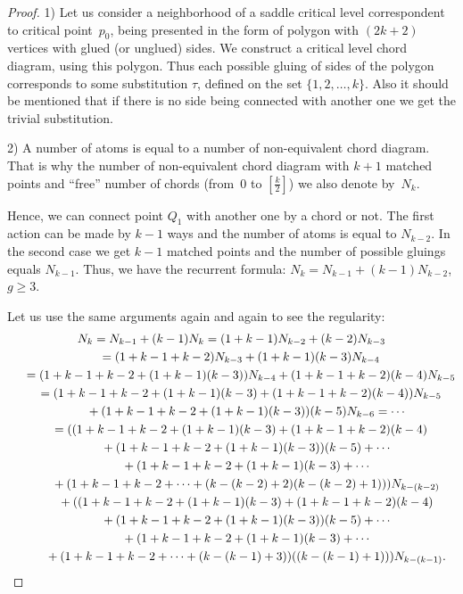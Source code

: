 \documentclass[pdftex]{sigma}
\numberwithin{equation}{section}
\begin{document}
\begin{proof}
1) Let us consider a neighborhood of a saddle critical level correspondent to critical point~$p_{0}$, being presented in the form of polygon with $(2k+2)$ vertices with glued (or unglued) sides. We construct a critical level chord diagram, using this polygon. Thus each possible gluing of sides of the polygon corresponds to some substitution $\tau$, def\/ined on the set $\{1,2,\dots,k\}$. Also it should be mentioned that if there is no side being connected with another one we get the trivial substitution.

2) A number of atoms is equal to a number of non-equivalent chord diagram. That is why the number of non-equivalent chord diagram with $k+1$ matched points and ``free'' number of chords (from~$0$ to $[\frac{k}{2}]$) we also denote by~$N_{k}$.

Hence, we can connect point $Q_1$ with another one by a chord or not. The f\/irst action can be made by $k-1$ ways and the number of atoms is equal to $N_{k-2}$. In the second case we get $k-1$ matched points and the number of possible gluings equals $N_{k-1}$. Thus, we have the recurrent formula: $N_{k}=N_{k-1}+(k-1) N_{k-2}$, $g\geq3$.

Let us use the same arguments again and again to see the regularity:
\begin{gather*}
N_{k} = N_{k-1}+(k-1) N_{k} = (1+k-1) N_{k-2}+(k-2) N_{k-3} \\
\hphantom{N_{k}}{} = (1+k-1+k-2) N_{k-3}+(1+k-1)(k-3) N_{k-4}\\
\hphantom{N_{k}}{} =(1+k-1+k-2+(1+k-1)(k-3)) N_{k-4}+(1+k-1+k-2)(k-4)N_{k-5} \\
\hphantom{N_{k}}{} = (1+k-1+k-2+(1+k-1)(k-3)+(1+k-1+k-2)(k-4)) N_{k-5}\\
\hphantom{N_{k}=}{}
+(1+k-1+k-2+(1+k-1)(k-3))(k-5) N_{k-6} = \cdots \\
\hphantom{N_{k}}{} = ((1+k-1+k-2+(1+k-1)(k-3)+(1+k-1+k-2)(k-4)\\
\hphantom{N_{k}=}{}
+(1+k-1+k-2+(1+k-1)(k-3))(k-5)+\cdots\\
\hphantom{N_{k}=}{} +(1+k-1+k-2+(1+k-1)(k-3)+\cdots\\
\hphantom{N_{k}=}{}
+(1+k-1+k-2+\cdots+ (k-(k-2)+2)(k-(k-2)+1))) N_{k-(k-2)}\\
\hphantom{N_{k}=}{}
 + ((1+k-1+k-2+(1+k-1)(k-3)+(1+k-1+k-2)(k-4)\\
\hphantom{N_{k}=}{}
+(1+k-1+k-2+(1+k-1)(k-3))(k-5)+\cdots \\
\hphantom{N_{k}=}{}
+(1+k-1+k-2+(1+k-1)(k-3)+\cdots\\
\hphantom{N_{k}=}{}
+(1+k-1+k-2+\cdots+ (k-(k-1)+3))((k-(k-1)+1))) N_{k-(k-1)}.
\end{gather*}


\end{proof}
\end{document}
